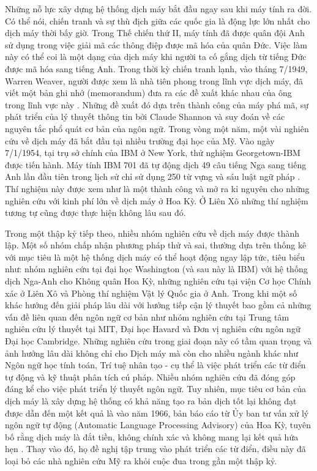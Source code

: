 Những nỗ lực xây dựng hệ thống dịch máy bắt đầu ngay sau khi máy tính ra đời. Có thể nói, chiến tranh và sự thù địch giữa các quốc gia là động lực lớn nhất cho dịch máy thời bấy giờ. Trong Thế chiến thứ II, máy tính đã được quân đội Anh sử dụng trong việc giải mã các thông điệp được mã hóa của quân Đức. Việc làm này có thể coi là một dạng của dịch máy khi người ta cố gắng dịch từ tiếng Đức được mã hóa sang tiếng Anh. Trong thời kỳ chiến tranh lạnh, vào tháng 7/1949, Warren Weaver, người được xem là nhà tiên phong trong lĩnh vực dịch máy, đã viết một bản ghi nhớ (memorandum) đưa ra các đề xuất khác nhau của ông trong lĩnh vực này \cite{hutchins}. Những đề xuất đó dựa trên thành công của máy phá mã, sự phát triển của lý thuyết thông tin bởi Claude Shannon và suy đoán về các nguyên tắc phổ quát cơ bản của ngôn ngữ. Trong vòng một năm, một vài nghiên cứu về dịch máy đã bắt đầu tại nhiều trường đại học của Mỹ. Vào ngày 7/1/1954, tại trụ sở chính của IBM ở New York, thử nghiệm Georgetown-IBM được tiến hành. Máy tính IBM 701 đã tự động dịch 49 câu tiếng Nga sang tiếng Anh lần đầu tiên trong lịch sử chỉ sử dụng 250 từ vựng và sáu luật ngữ pháp \cite{hutchins}. Thí nghiệm này được xem như là một thành công và mở ra kỉ nguyên cho những nghiên cứu với kinh phí lớn về dịch máy ở Hoa Kỳ. Ở Liên Xô những thí nghiệm tương tự cũng được thực hiện không lâu sau đó.

Trong một thập kỷ tiếp theo, nhiều nhóm nghiên cứu về dịch máy được thành lập. Một số nhóm chấp nhận phương pháp thử và sai, thường dựa trên thống kê với mục tiêu là một hệ thống dịch máy có thể hoạt động ngay lập tức, tiêu biểu như: nhóm nghiên cứu tại đại học Washington (và sau này là IBM) với hệ thống dịch Nga-Anh cho Không quân Hoa Kỳ, những nghiên cứu tại viện Cơ học Chính xác ở Liên Xô và Phòng thí nghiệm Vật lý Quốc gia ở Anh. Trong khi một số khác hướng đến giải pháp lâu dài với hướng tiếp cận lý thuyết bao gồm cả những vấn đề liên quan đến ngôn ngữ cơ bản như nhóm nghiên cứu tại Trung tâm nghiên cứu lý thuyết tại MIT, Đại học Havard và Đơn vị nghiên cứu ngôn ngữ Đại học Cambridge. Những nghiên cứu trong giai đoạn này có tầm quan trọng và ảnh hưởng lâu dài không chỉ cho Dịch máy mà còn cho nhiều ngành khác như Ngôn ngữ học tính toán, Trí tuệ nhân tạo - cụ thể là việc phát triển các từ điển tự động và kỹ thuật phân tích cú pháp. Nhiều nhóm nghiên cứu đã đóng góp đáng kể cho việc phát triển lý thuyết ngôn ngữ. Tuy nhiên, mục tiêu cơ bản của dịch máy là xây dựng hệ thống có khả năng tạo ra bản dịch tốt lại không đạt được dẫn đến một kết quả là vào năm 1966, bản báo cáo từ Ủy ban tư vấn xử lý ngôn ngữ tự động (Automatic Language Processing Advisory) của Hoa Kỳ, tuyên bố rằng dịch máy là đắt tiền, không chính xác và không mang lại kết quả hứa hẹn \cite{hutchins}. Thay vào đó, họ đề nghị tập trung vào phát triển các từ điển, điều này đã loại bỏ các nhà nghiên cứu Mỹ ra khỏi cuộc đua trong gần một thập kỷ.

